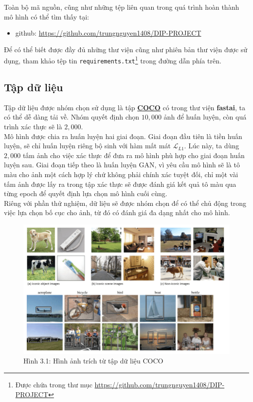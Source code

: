 \documentclass[a4paper]{article}
\begin{document}
\noindent
Toàn bộ mã nguồn, cũng như những tệp liên quan trong quá trình hoàn thành mô hình có thể tìm thấy tại:
\begin{itemize}
    \item github: \href{https://github.com/trungnguyen1408/DIP-PROJECT}{https://github.com/trungnguyen1408/DIP-PROJECT}
\end{itemize}
Để có thể biết được đầy đủ những thư viện cũng như phiên bản thư viện được sử dụng, tham khảo tệp tin \texttt{requirements.txt}\footnote{Được chứa trong thư mục \href{https://github.com/trungnguyen1408/DIP-PROJECT}{https://github.com/trungnguyen1408/DIP-PROJECT}} trong đường dẫn phía trên.

\subsection{Tập dữ liệu}
Tập dữ liệu được nhóm chọn sử dụng là tập \href{https://cocodataset.org/#download}{\textbf{COCO}} có trong thư viện \textbf{fastai}, ta có thể dễ dàng tải về. Nhóm quyết định chọn $10,000$ ảnh để huấn luyện, còn quá trình xác thực sẽ là $2,000$.\\
Mô hình được chia ra huấn luyện hai giai đoạn. Giai đoạn đầu tiên là tiền huấn luyện, sẽ chỉ huấn luyện riêng bộ sinh với hàm mất mát $\mathcal{L}_{L1}$. Lúc này, ta dùng $2,000$ tấm ảnh cho việc xác thực để đưa ra mô hình phù hợp cho giai đoạn huấn luyện sau. Giai đoạn tiếp theo là huấn luyện GAN, vì yêu cầu mô hình sẽ là  tô màu cho ảnh một cách hợp lý chứ không phải chính xác tuyệt đối, chỉ một vài tấm ảnh được lấy ra trong tập xác thực sẽ được đánh giá kết quả tô màu qua từng epoch để quyết định lựa chọn mô hình cuối cùng.\\
Riêng với phần thử nghiệm, dữ liệu sẽ được nhóm chọn để có thể chủ động trong việc lựa chọn bố cục cho ảnh, từ đó có đánh giá đa dạng nhất cho mô hình.

\begin{figure}[h!]
\centering
\includegraphics[width=12cm]{images/3_1.png}
\caption{Hình 3.1: Hình ảnh trích từ tập dữ liệu COCO}
\end{figure}
\end{document}
